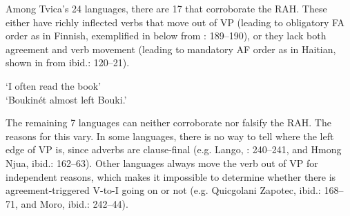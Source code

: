 \documentclass[output=paper,colorlinks,citecolor=brown,draft,draftmode]{langscibook}
\begin{document}
Among Tvica’s 24 languages, there are 17 that corroborate the RAH. These either have richly inflected verbs that move out of VP (leading to obligatory FA order as in Finnish, exemplified in  below from \citealt{Tvica2017}: 189–190), or they lack both agreement and verb movement (leading to mandatory AF order as in Haitian, shown in  from ibid.: 120–21).


\ea\label{ex:petzell:25}
\glt `I often read the book’  \\
\glt `Boukinét almost left Bouki.’
\z
\z


The remaining 7 languages can neither corroborate nor falsify the RAH. The reasons for this vary. In some languages, there is no way to tell where the left edge of VP is, since adverbs are clause-final (e.g. Lango, \citealt{Tvica2017}: 240–241, and Hmong Njua, ibid.: 162–63). Other languages always move the verb out of VP for independent reasons, which makes it impossible to determine whether there is agreement-triggered V-to-I going on or not (e.g. Quicgolani Zapotec, ibid.: 168–71, and Moro, ibid.: 242–44).
\end{document}
